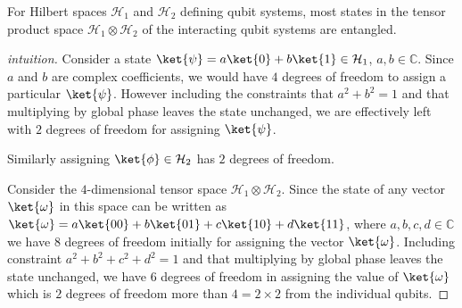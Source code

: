 \begin{prop}
    For Hilbert spaces $\mathcal{H}_1$ and $\mathcal{H}_2$ defining qubit systems, most states in the tensor product space $\mathcal{H}_1 \otimes \mathcal{H}_2$ of the interacting qubit systems are entangled.
\end{prop}
\begin{proof}[intuition]
    Consider a state $\ket{\psi} = a \ket{0} + b \ket{1} \in \mathcal{H}_1$, $a,b \in \mathbb{C}$. Since $a$ and $b$ are complex coefficients, we would have $4$ degrees of freedom to assign a particular $\ket{\psi}$. However including the constraints that $a^2 + b^2 = 1$ and that multiplying by global phase leaves the state unchanged, we are effectively left with $2$ degrees of freedom for assigning $\ket{\psi}$. 
    
Similarly assigning $\ket{\phi} \in \mathcal{H}_2$ has $2$ degrees of freedom.

    Consider the $4$-dimensional tensor space $\mathcal{H}_1 \otimes \mathcal{H}_2$. Since the state of any vector $\ket{\omega}$ in this space can be written as $\ket{\omega} = a \ket{00} + b \ket{01} + c \ket{10} + d \ket{11}$, where $a, b, c, d \in \mathbb{C}$ we have $8$ degrees of freedom initially for assigning the vector $\ket{\omega}$. Including constraint $a^2 + b^2 + c^2 + d^2 = 1$ and that multiplying by global phase leaves the state unchanged, we have $6$ degrees of freedom in assigning the value of $\ket{\omega}$ which is $2$ degrees of freedom more than $4 = 2 \times 2$ from the individual qubits.
\end{proof}
